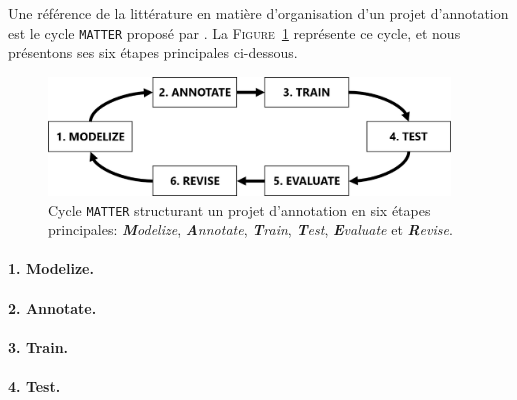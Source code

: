 			Une référence de la littérature en matière d'organisation d'un projet d'annotation est le cycle \texttt{MATTER} proposé par \cite{pustejovsky-stubbs:2012:natural-language-annotation}.
			La \textsc{Figure~\ref{figure:2.2.1-ORGANISATION-ANNOTATION-ETAPES-CLES-MATTER}} représente ce cycle, et nous présentons ses six étapes principales ci-dessous.
			
			\begin{figure}[!htb]
				\centering
				\includegraphics[width=0.95\textwidth]{figures/etatdelart-pustejovsky-2012-cycle-matter}
				\caption{
					Cycle \texttt{MATTER} structurant un projet d'annotation en six étapes principales: \textit{\textbf{M}odelize}, \textit{\textbf{A}nnotate}, \textit{\textbf{T}rain}, \textit{\textbf{T}est}, \textit{\textbf{E}valuate} et \textit{\textbf{R}evise}.
				}
				\label{figure:2.2.1-ORGANISATION-ANNOTATION-ETAPES-CLES-MATTER}
			\end{figure}
			
			
			\paragraph{1. Modelize.}
			
			\paragraph{2. Annotate.}
			
			\paragraph{3. Train.}
			
			\paragraph{4. Test.}
			
